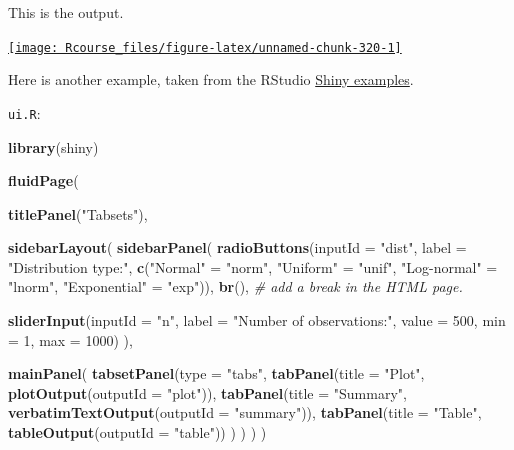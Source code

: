 \documentclass[]{book}
\newenvironment{Shaded}{\begin{snugshade}}{\end{snugshade}}
\newcommand{\KeywordTok}[1]{\textcolor[rgb]{0.13,0.29,0.53}{\textbf{#1}}}
\newcommand{\DataTypeTok}[1]{\textcolor[rgb]{0.13,0.29,0.53}{#1}}
\newcommand{\DecValTok}[1]{\textcolor[rgb]{0.00,0.00,0.81}{#1}}
\newcommand{\StringTok}[1]{\textcolor[rgb]{0.31,0.60,0.02}{#1}}
\newcommand{\CommentTok}[1]{\textcolor[rgb]{0.56,0.35,0.01}{\textit{#1}}}
\newcommand{\NormalTok}[1]{#1}
\theoremstyle{definition}
\theoremstyle{definition}
\theoremstyle{definition}
\theoremstyle{remark}
\begin{document}
This is the output.

\href{http://shiny.rstudio.com/gallery/example-01-hello.html}{\texttt{[image: Rcourse\_files/figure-latex/unnamed-chunk-320-1]} }

Here is another example, taken from the RStudio
\href{https://github.com/rstudio/shiny-examples/tree/master/006-tabsets}{Shiny
examples}.

\texttt{ui.R}:

\begin{Shaded}
\begin{Highlighting}[]
\KeywordTok{library}\NormalTok{(shiny)}

\KeywordTok{fluidPage}\NormalTok{(}
    
  \KeywordTok{titlePanel}\NormalTok{(}\StringTok{"Tabsets"}\NormalTok{),}
  
  \KeywordTok{sidebarLayout}\NormalTok{(}
    \KeywordTok{sidebarPanel}\NormalTok{(}
      \KeywordTok{radioButtons}\NormalTok{(}\DataTypeTok{inputId =} \StringTok{"dist"}\NormalTok{, }
                   \DataTypeTok{label =} \StringTok{"Distribution type:"}\NormalTok{,}
                   \KeywordTok{c}\NormalTok{(}\StringTok{"Normal"}\NormalTok{ =}\StringTok{ "norm"}\NormalTok{,}
                     \StringTok{"Uniform"}\NormalTok{ =}\StringTok{ "unif"}\NormalTok{,}
                     \StringTok{"Log-normal"}\NormalTok{ =}\StringTok{ "lnorm"}\NormalTok{,}
                     \StringTok{"Exponential"}\NormalTok{ =}\StringTok{ "exp"}\NormalTok{)),}
      \KeywordTok{br}\NormalTok{(), }\CommentTok{# add a break in the HTML page.}
      
      \KeywordTok{sliderInput}\NormalTok{(}\DataTypeTok{inputId =} \StringTok{"n"}\NormalTok{, }
                  \DataTypeTok{label =} \StringTok{"Number of observations:"}\NormalTok{, }
                   \DataTypeTok{value =} \DecValTok{500}\NormalTok{,}
                   \DataTypeTok{min =} \DecValTok{1}\NormalTok{, }
                   \DataTypeTok{max =} \DecValTok{1000}\NormalTok{)}
\NormalTok{    ),}
    
    \KeywordTok{mainPanel}\NormalTok{(}
      \KeywordTok{tabsetPanel}\NormalTok{(}\DataTypeTok{type =} \StringTok{"tabs"}\NormalTok{, }
        \KeywordTok{tabPanel}\NormalTok{(}\DataTypeTok{title =} \StringTok{"Plot"}\NormalTok{, }\KeywordTok{plotOutput}\NormalTok{(}\DataTypeTok{outputId =} \StringTok{"plot"}\NormalTok{)), }
        \KeywordTok{tabPanel}\NormalTok{(}\DataTypeTok{title =} \StringTok{"Summary"}\NormalTok{, }\KeywordTok{verbatimTextOutput}\NormalTok{(}\DataTypeTok{outputId =} \StringTok{"summary"}\NormalTok{)), }
        \KeywordTok{tabPanel}\NormalTok{(}\DataTypeTok{title =} \StringTok{"Table"}\NormalTok{, }\KeywordTok{tableOutput}\NormalTok{(}\DataTypeTok{outputId =} \StringTok{"table"}\NormalTok{))}
\NormalTok{      )}
\NormalTok{    )}
\NormalTok{  )}
\NormalTok{)}
\end{Highlighting}
\end{Shaded}
\end{document}
